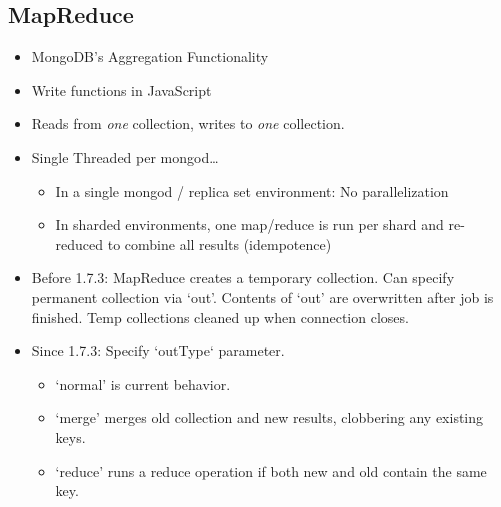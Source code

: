\documentclass[xcolor=dvipsnames]{beamer}
\newenvironment{itemizeframe}
               {\begin{frame}\startitemizeframe} 
               {\stopitemizeframe\end{frame}}
\newcommand\startitemizeframe{\begin{itemize}} \newcommand\stopitemizeframe{\end{itemize}}
\begin{document}
\subsection{MapReduce}
\begin{itemizeframe}
    \frametitle{MongoDB MapReduce}
    \item MongoDB's Aggregation Functionality
    \item Write functions in JavaScript
    \item Reads from {\em one} collection, writes to {\em one} collection.
    \item Single Threaded per mongod\ldots
        \begin{itemize} 
            \item In a single mongod / replica set environment: No parallelization 
            \item In sharded environments, one map/reduce is run per shard and re-reduced to combine all results (idempotence)
        \end{itemize}
\end{itemizeframe}
\begin{itemizeframe}
    \frametitle{MongoDB MapReduce}
    \framesubtitle{Output Behavior}
    \item Before 1.7.3: MapReduce creates a temporary collection.  Can specify permanent collection via `out'. Contents of `out' are overwritten after job is finished.  Temp collections cleaned up when connection closes.
    \item Since 1.7.3: Specify `outType` parameter. 
        \begin{itemize}
            \item `normal' is current behavior.  
            \item `merge' merges old collection and new results, clobbering any existing keys.  
            \item `reduce' runs a reduce operation if both new and old contain the same key.
        \end{itemize}
\end{itemizeframe}
\end{document}
